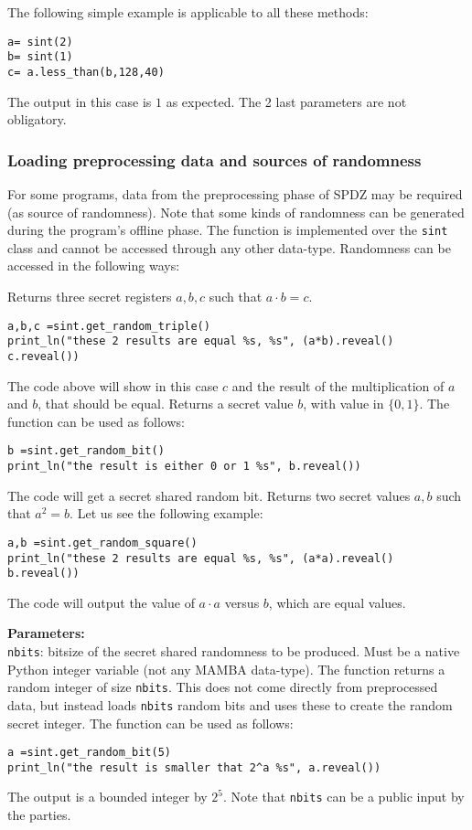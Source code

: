 \noindent
The following simple example is applicable to all these methods: 
\begin{lstlisting}
a= sint(2)
b= sint(1)
c= a.less_than(b,128,40)
\end{lstlisting}
The output in this case is $1$ as expected. The 2 last parameters are not obligatory.


\subsubsection{Loading preprocessing data and sources of randomness}

For some programs, data from the preprocessing phase of SPDZ may be required (as source of randomness). Note that some kinds of randomness can  be generated during the program's offline phase. The function is implemented over the \verb|sint| class and cannot be accessed through any other data-type. Randomness can be accessed in the following ways:

Returns three secret registers $a, b, c$ such that $a\cdot b = c$.
\begin{lstlisting}
a,b,c =sint.get_random_triple()
print_ln("these 2 results are equal %s, %s", (a*b).reveal() c.reveal())
\end{lstlisting}
The code above will show in this case $c$ and the result of the multiplication of $a$ and $b$, that should be equal.
Returns a secret value $b$, with value in $\{0, 1\}$. The function can be used as follows:
\begin{lstlisting}
b =sint.get_random_bit()
print_ln("the result is either 0 or 1 %s", b.reveal())
\end{lstlisting}
The code will get a secret shared random bit.
Returns two secret values $a, b$ such that $a^2 = b$. Let us see the following example: 
\begin{lstlisting}
a,b =sint.get_random_square()
print_ln("these 2 results are equal %s, %s", (a*a).reveal() b.reveal())
\end{lstlisting}
The code will output the value of $a \cdot a$ versus $b$,  which are equal values. 

\textbf{Parameters:}\\
	\verb|nbits|: bitsize of the secret shared randomness to be produced. Must be a native Python integer variable (not any MAMBA data-type).
The function returns a random integer of size \verb|nbits|. This does not come directly from preprocessed data, but instead loads \verb|nbits| random bits and uses these to create the random secret integer. The function can be used as follows:
\begin{lstlisting}
a =sint.get_random_bit(5)
print_ln("the result is smaller that 2^a %s", a.reveal())
\end{lstlisting}
The output is a bounded integer by $2^5$. Note that \verb|nbits| can be a public input by the parties. 

